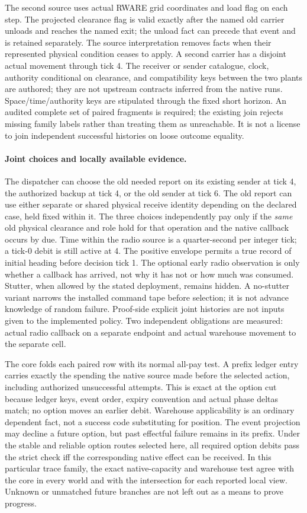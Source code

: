 \documentclass{article}
\begin{document}
The second source uses actual RWARE grid coordinates and load flag
on each step. The projected clearance flag is valid exactly after
the named old carrier unloads and reaches the named exit; the
unload fact can precede that event and is retained separately.
The source interpretation removes facts when their represented
physical condition ceases to apply. A second carrier has a disjoint
actual movement through tick 4. The receiver or sender catalogue,
clock, authority conditional on clearance, and compatibility keys
between the two plants are authored; they are not upstream
contracts inferred from the native runs. Space/time/authority keys
are stipulated through the fixed short horizon.
An audited complete set of paired fragments is required; the
existing join rejects missing family labels rather than treating
them as unreachable. It is not a license to join independent
successful histories on loose outcome equality.

\paragraph{Joint choices and locally available evidence.}
The dispatcher can choose the old needed report on its existing
sender at tick 4, the authorized backup at tick 4, or the old
sender at tick 6. The old report can use either separate or
shared physical receive identity depending on the declared
case, held fixed within it. The three choices independently
pay only if the \emph{same} old physical clearance and role
hold for that operation and the native callback occurs by due.
Time within the radio source is a quarter-second per integer tick;
a tick-0 debit is still active at 4. The positive envelope
permits a true record of initial heading before decision tick 1.
The optional early radio observation is only whether a callback
has arrived, not why it has not or how much was consumed.
Stutter, when allowed by the stated deployment, remains hidden.
A no-stutter variant narrows the installed command tape before
selection; it is not advance knowledge of random failure.
Proof-side explicit joint histories are not inputs given to the
implemented policy. Two independent obligations are measured:
actual radio callback on a separate endpoint and actual warehouse
movement to the separate cell.

The core folds each paired row with its normal all-pay test.
A prefix ledger entry carries exactly the spending the native source
made before the selected action, including authorized unsuccessful
attempts. This is exact at the option cut because ledger keys, event
order, expiry convention and actual phase deltas match; no option
moves an earlier debit. Warehouse applicability is an ordinary
dependent fact, not a success code substituting for position.
The event projection may decline a future option, but past
effectful failure remains in its prefix. Under the stable
and reliable option routes selected here, all required option
debits pass the strict check iff the corresponding native effect
can be received. In this particular trace family, the exact
native-capacity and warehouse test agree with the core in
every world and with the intersection for each reported local
view. Unknown or unmatched future branches are not left out
as a means to prove progress.
\end{document}
